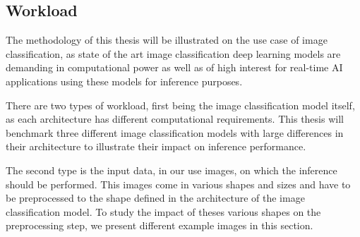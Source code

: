 \subsection{Workload}
\label{chap:workload}
The methodology of this thesis will be illustrated on the use case of image classification, as state of the art image classification deep learning models are demanding in computational power as well as of high interest for real-time AI applications using these models for inference purposes.

There are two types of workload, first being the image classification model itself, as each architecture has different computational requirements.
This thesis will benchmark three different image classification models with large differences in their architecture to illustrate their impact on inference performance.

The second type is the input data, in our use images, on which the inference should be performed.
This images come in various shapes and sizes and have to be preprocessed to the shape defined in the architecture of the image classification model.
To study the impact of theses various shapes on the preprocessing step, we present different example images in this section.

